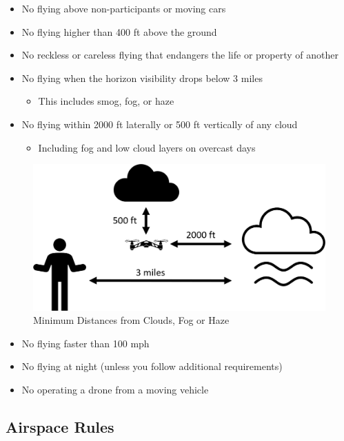 \documentclass[
  12pt,
]{book}
\providecommand{\tightlist}{%
  \setlength{\itemsep}{0pt}\setlength{\parskip}{0pt}}
\begin{document}
\begin{itemize}
\tightlist
\item
  No flying above non-participants or moving cars
\item
  No flying higher than 400 ft above the ground
\item
  No reckless or careless flying that endangers the life or property of another
\item
  No flying when the horizon visibility drops below 3 miles

  \begin{itemize}
  \tightlist
  \item
    This includes smog, fog, or haze
  \end{itemize}
\item
  No flying within 2000 ft laterally or 500 ft vertically of any cloud

  \begin{itemize}
  \tightlist
  \item
    Including fog and low cloud layers on overcast days
  \end{itemize}
\end{itemize}

\begin{figure}

{\centering \includegraphics[width=0.7\linewidth]{images/cloud_distance} 

}

\caption{Minimum Distances from Clouds, Fog or Haze}\label{fig:cloud-distance}
\end{figure}

\begin{itemize}
\tightlist
\item
  No flying faster than 100 mph
\item
  No flying at night (unless you follow additional requirements)
\item
  No operating a drone from a moving vehicle
\end{itemize}

\subsection{Airspace Rules}\label{airspace-rules}
\end{document}
